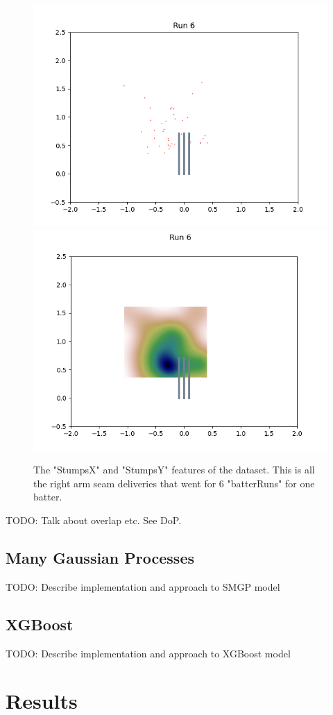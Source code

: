 \documentclass[12pt,a4paper]{report}
\theoremstyle{definition}
\begin{document}
\begin{figure}[H]
    \centering
    \includegraphics[width=0.49\linewidth]{jos_buttler_6_runs_right_arm_seam_stumps.png}
    \includegraphics[width=0.49\linewidth]{jos_buttler_6_runs_right_arm_seam_stumps_heat_map.png}
    \caption{The "StumpsX" and "StumpsY" features of the dataset. This is all the right arm seam deliveries that went for 6 "batterRuns" for one batter.}
    \label{fig:StumpsXY6Runs}
\end{figure}

TODO: Talk about overlap etc. See DoP.

\section{Many Gaussian Processes}

TODO: Describe implementation and approach to SMGP model

\section{XGBoost}

TODO: Describe implementation and approach to XGBoost model

\chapter{Results}
\end{document}
